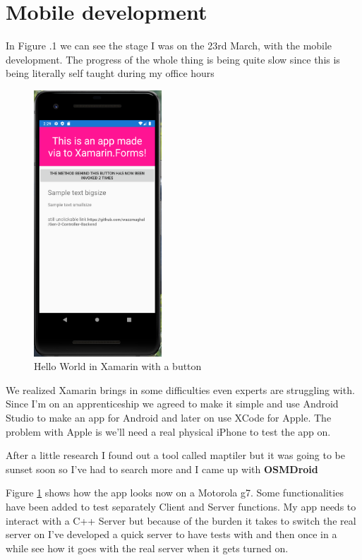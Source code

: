 \documentclass[a4paper,12pt]{book}
\begin{document}
\clearpage

\part{Mobile development}

In Figure .1 we can see the stage I was on the 23rd March, with the mobile development. The progress of the whole thing is being quite slow since this is being literally self taught during my office hours

\begin{figure}
\centering
\includegraphics[width=4.8cm]{./capture-app.PNG}
\caption{Hello World in Xamarin with a button\footnotemark{}}\label{fig:xamarin}
\end{figure} 



We realized Xamarin brings in some difficulties even experts are struggling with. Since I'm on an apprenticeship we agreed to make it simple and use Android Studio to make an app for Android and later on use XCode for Apple. The problem with Apple is we'll need a real physical iPhone to test the app on.

After a little research I found out a tool called maptiler but it was going to be sunset soon so I've had to search more and I came up with \textbf{OSMDroid}

Figure \ref{fig:xamarin} shows how the app looks now on a Motorola g7. Some functionalities have been added to test separately Client and Server functions. My app needs to interact with a C++ Server but because of the burden it takes to switch the real server on I've developed a quick server to have tests with and then once in a while see how it goes with the real server when it gets turned on.
\end{document}
